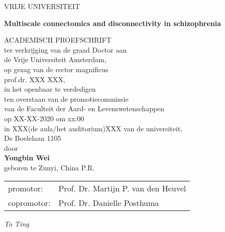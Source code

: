 \documentclass[10pt,twoside,b5paper,final]{book}
\def\maintitle{Multiscale connectomics and disconnectivity in schizophrenia}
\begin{document}
\begin{center}
\vspace*{1cm}
VRIJE UNIVERSITEIT\\
\vspace{1cm}
  {\LARGE\bfseries\maintitle\par}
  \vspace{1cm}
ACADEMISCH PROEFSCHRIFT\\
\vspace{2cm}
ter verkrijging van de graad Doctor aan\\
de Vrije Universiteit Amsterdam,\\
op gezag van de rector magnificus\\
prof.dr. XXX XXX,\\
in het openbaar te verdedigen\\
ten overstaan van de promotiecommissie\\
van de Faculteit der Aard- en Levenswetenschappen\\
op XX-XX-2020 om xx:00\\
in XXX(de aula/het auditorium)XXX van de universiteit,\\
De Boelelaan 1105\\
\vspace{1.4cm}
door\\
\vspace{1.4cm}
\textbf{Yongbin Wei}\\
\vspace{0.4cm}
geboren te Zunyi, China P.R.\\  
\end{center}
\newpage

\begin{tabular}{ll}
promotor: & Prof. Dr. Martijn P. van den Heuvel\\
copromotor: & Prof. Dr. Danielle Posthuma
\end{tabular}
\newpage

\pagestyle{empty}
\begin{center}
    \normalsize
    \vspace*{7cm}
    \textit{To Ting}
\end{center}
\newpage
\newpage\null\newpage



\pagestyle{plain}

\tableofcontents
\newpage

\mainmatter


\justifying



% 



\newpage
\newpage

\backmatter
\pagestyle{backmatter}



\end{document}
